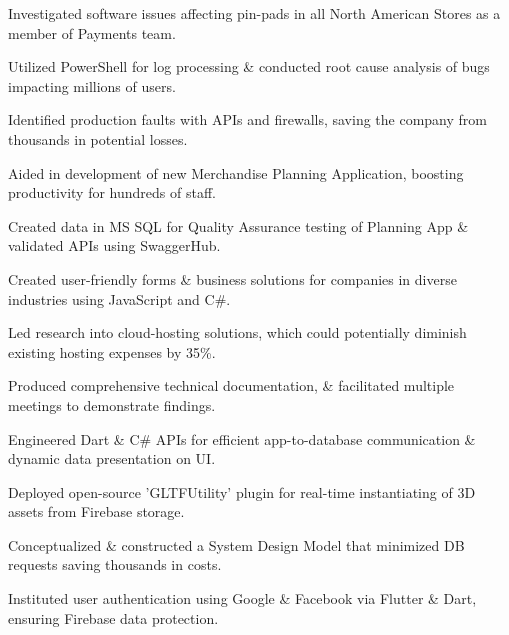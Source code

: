 \documentclass[]{deedy-resume-openfont}
\begin{document}
\begin{tightemize}
\item Investigated software issues affecting pin-pads in all North American Stores as a member of Payments team.
\item Utilized PowerShell for log processing \& conducted root cause analysis of bugs impacting millions of users.
\item Identified production faults with APIs and firewalls, saving the company from thousands in potential losses.
\item Aided in development of new Merchandise Planning Application, boosting productivity for hundreds of staff.
\item Created data in MS SQL for Quality Assurance testing of Planning App \& validated APIs using SwaggerHub.
\end{tightemize}
\sectionsep

\begin{tightemize}
\item Created user-friendly forms \& business solutions for companies in diverse industries using JavaScript and C\#.
\item Led research into cloud-hosting solutions, which could potentially diminish existing hosting expenses by 35\%.
\item Produced comprehensive technical documentation, \& facilitated multiple meetings to demonstrate findings.
\end{tightemize}




\begin{tightemize}
\item Engineered Dart \& C\# APIs for efficient app-to-database communication \& dynamic data presentation on UI.
\item Deployed open-source 'GLTFUtility' plugin for real-time instantiating of 3D assets from Firebase storage.
\item Conceptualized \& constructed a System Design Model that minimized DB requests saving thousands in costs.
\item Instituted user authentication using Google \& Facebook via Flutter \& Dart, ensuring Firebase data protection.
\end{tightemize}
\sectionsep
\end{document}
